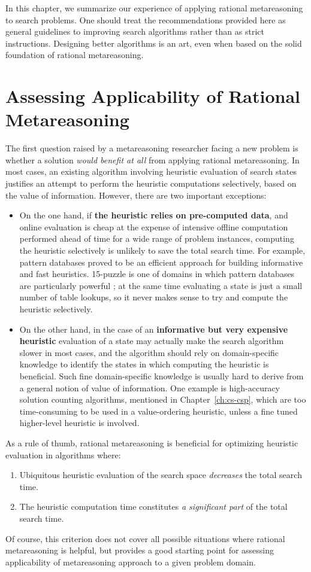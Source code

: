 In this chapter, we summarize our experience of applying rational
metareasoning to search problems. One should treat the recommendations
provided here as general guidelines to improving search algorithms
rather than as strict instructions. Designing better algorithms is an
art, even when based on the solid foundation of rational
metareasoning.

\section{Assessing Applicability of Rational Metareasoning}

The first question raised by a metareasoning researcher facing a new
problem is whether a solution \emph{would benefit at all} from
applying rational metareasoning. In most cases, an existing algorithm
involving heuristic evaluation of search states justifies an attempt
to perform the heuristic computations selectively, based on the value
of information. However, there are two important exceptions:
\begin{itemize}
\item On the one hand, if \textbf{the heuristic relies on pre-computed
  data}, and online evaluation is cheap at the expense of intensive
  offline computation performed ahead of time for a wide
  range of problem instances, computing the heuristic selectively is
  unlikely to save the total search time. For example, pattern
  databases \cite{pattern} proved to be an efficient approach for
  building informative and fast heuristics. 15-puzzle is one of
  domains in which pattern databases are particularly powerful
  \cite{Felner.apdb}; at the same time evaluating a state is just a
  small number of table lookups, so it never makes sense to try and
  compute the heuristic selectively.
\item On the other hand, in the case of an \textbf{informative but
  very expensive heuristic} evaluation of a state may
  actually make the search algorithm slower in most cases, and the
  algorithm should rely on domain-specific knowledge to
  identify the states in which computing the heuristic is beneficial. 
  Such fine domain-specific knowledge is usually hard to derive from
  a general notion of value of information. One example is
  high-accuracy solution counting algorithms, mentioned in
  Chapter~\ref{ch:cs-csp}, which are too time-consuming to be used
  in a value-ordering heuristic, unless a fine tuned higher-level
  heuristic is involved.
\end{itemize}
As a rule of thumb, rational metareasoning is beneficial for
optimizing heuristic evaluation in algorithms where:
\begin{enumerate}
\item Ubiquitous heuristic evaluation of the search space \emph{decreases} the total search
  time.
\item The heuristic computation time constitutes \emph{a significant part} of
  the total search time. 
\end{enumerate}
Of course, this criterion does not cover all possible situations where
rational metareasoning is helpful, but provides a good starting point
for assessing applicability of metareasoning approach to a given
problem domain.

